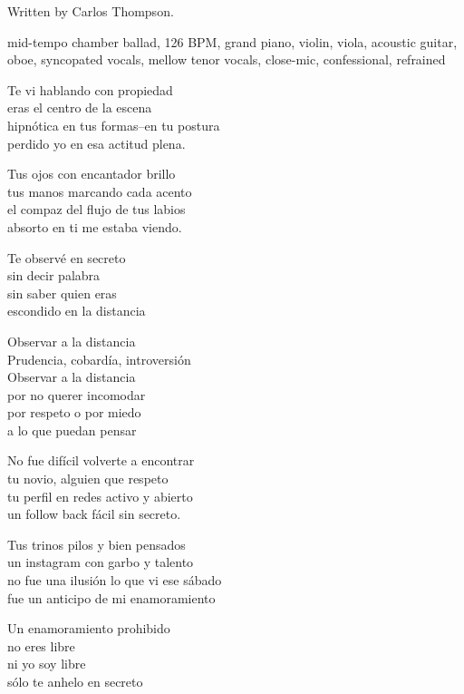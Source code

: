 
\begin{notes}
Written by Carlos Thompson.
\end{notes}
\begin{style}
mid-tempo chamber ballad, 126 BPM, grand piano, violin, viola, acoustic guitar, oboe, syncopated vocals, mellow tenor vocals, close-mic, confessional, refrained
\end{style}
\begin{lyrics}
Te vi hablando con propiedad\\
eras el centro de la escena\\
hipnótica en tus formas–en tu postura\\
perdido yo en esa actitud plena.

Tus ojos con encantador brillo\\
tus manos marcando cada acento\\
el compaz del flujo de tus labios\\
absorto en ti me estaba viendo.

Te observé en secreto\\
sin decir palabra\\
sin saber quien eras\\
escondido en la distancia

Observar a la distancia\\
Prudencia, cobardía, introversión\\
Observar a la distancia\\
por no querer incomodar\\
por respeto o por miedo\\
a lo que puedan pensar

No fue difícil volverte a encontrar\\
tu novio, alguien que respeto\\
tu perfil en redes activo y abierto\\
un follow back fácil sin secreto.

Tus trinos pilos y bien pensados\\
un instagram con garbo y talento\\
no fue una ilusión lo que vi ese sábado\\
fue un anticipo de mi enamoramiento

Un enamoramiento prohibido\\
no eres libre\\
ni yo soy libre\\
sólo te anhelo en secreto


\end{lyrics}
